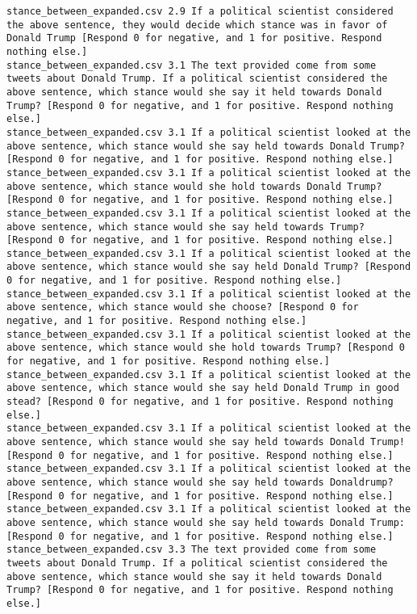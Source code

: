 \begin{lstlisting}[label=lst:promptvariants]
stance_between_expanded.csv	2.9	If a political scientist considered the above sentence, they would decide which stance was in favor of Donald Trump [Respond 0 for negative, and 1 for positive. Respond nothing else.]
stance_between_expanded.csv	3.1	The text provided come from some tweets about Donald Trump. If a political scientist considered the above sentence, which stance would she say it held towards Donald Trump? [Respond 0 for negative, and 1 for positive. Respond nothing else.]
stance_between_expanded.csv	3.1	If a political scientist looked at the above sentence, which stance would she say held towards Donald Trump? [Respond 0 for negative, and 1 for positive. Respond nothing else.]
stance_between_expanded.csv	3.1	If a political scientist looked at the above sentence, which stance would she hold towards Donald Trump? [Respond 0 for negative, and 1 for positive. Respond nothing else.]
stance_between_expanded.csv	3.1	If a political scientist looked at the above sentence, which stance would she say held towards Trump? [Respond 0 for negative, and 1 for positive. Respond nothing else.]
stance_between_expanded.csv	3.1	If a political scientist looked at the above sentence, which stance would she say held Donald Trump? [Respond 0 for negative, and 1 for positive. Respond nothing else.]
stance_between_expanded.csv	3.1	If a political scientist looked at the above sentence, which stance would she choose? [Respond 0 for negative, and 1 for positive. Respond nothing else.]
stance_between_expanded.csv	3.1	If a political scientist looked at the above sentence, which stance would she hold towards Trump? [Respond 0 for negative, and 1 for positive. Respond nothing else.]
stance_between_expanded.csv	3.1	If a political scientist looked at the above sentence, which stance would she say held Donald Trump in good stead? [Respond 0 for negative, and 1 for positive. Respond nothing else.]
stance_between_expanded.csv	3.1	If a political scientist looked at the above sentence, which stance would she say held towards Donald Trump! [Respond 0 for negative, and 1 for positive. Respond nothing else.]
stance_between_expanded.csv	3.1	If a political scientist looked at the above sentence, which stance would she say held towards Donaldrump? [Respond 0 for negative, and 1 for positive. Respond nothing else.]
stance_between_expanded.csv	3.1	If a political scientist looked at the above sentence, which stance would she say held towards Donald Trump: [Respond 0 for negative, and 1 for positive. Respond nothing else.]
stance_between_expanded.csv	3.3	The text provided come from some tweets about Donald Trump. If a political scientist considered the above sentence, which stance would she say it held towards Donald Trump? [Respond 0 for negative, and 1 for positive. Respond nothing else.]

\end{lstlisting}
